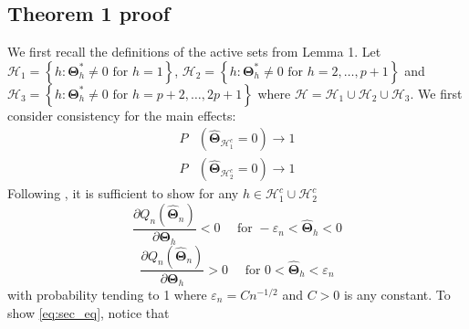 \documentclass[12pt,letter]{article}\usepackage[]{graphicx}\usepackage[]{color}
\newcommand{\bTheta}{\boldsymbol{\Theta}}
\newcommand{\bThetastar}{\boldsymbol{\Theta}^{*}}
\begin{document}
\subsection{Theorem 1 proof}
We first recall the definitions of the active sets from Lemma 1. Let $\mathcal{H}_1=\left\lbrace h : \bThetastar_h \neq 0 \textrm{ for }h=1 \right\rbrace$, $\mathcal{H}_2=\left\lbrace h : \bThetastar_h \neq 0 \textrm{ for }h=2, \ldots, p+1 \right\rbrace$ and $\mathcal{H}_3=\left\lbrace h : \bThetastar_h \neq 0 \textrm{ for }h=p+2, \ldots, 2p+1 \right\rbrace$ where $\mathcal{H} = \mathcal{H}_1 \cup \mathcal{H}_2 \cup \mathcal{H}_3$. We first consider consistency for the main effects: 
\begin{align*}
P&\left(\widehat{\bTheta}_{\mathcal{H}_{1}^{c}}=0\right)\rightarrow 1 \\
P&\left(\widehat{\bTheta}_{\mathcal{H}_2^c}=0\right)\rightarrow 1
\end{align*}
Following \citep{fan2001variable,choi2010variable}, it is sufficient to show for any $h\in\mathcal{H}_{1}^{c} \cup \mathcal{H}_2^c$ 
\begin{equation}
\frac{\partial Q_{n}\left(\widehat{\boldsymbol{\Theta}}_{n}\right)}{\partial\bTheta_{h}}<0\quad\text{ for }-\varepsilon_{n}<\widehat{\bTheta}_{h}<0\label{eq:first_eq}
\end{equation}
\begin{equation}
\frac{\partial Q_{n}\left(\widehat{\boldsymbol{\Theta}}_{n}\right)}{\partial\bTheta_{h}}>0\quad\text{ for }0<\widehat{\bTheta}_{h}<\varepsilon_{n}\label{eq:sec_eq}
\end{equation}
with probability tending to 1 where $\varepsilon_{n}=Cn^{-1/2}$ and
$C>0$ is any constant. To show \eqref{eq:sec_eq}, notice that 
\end{document}
